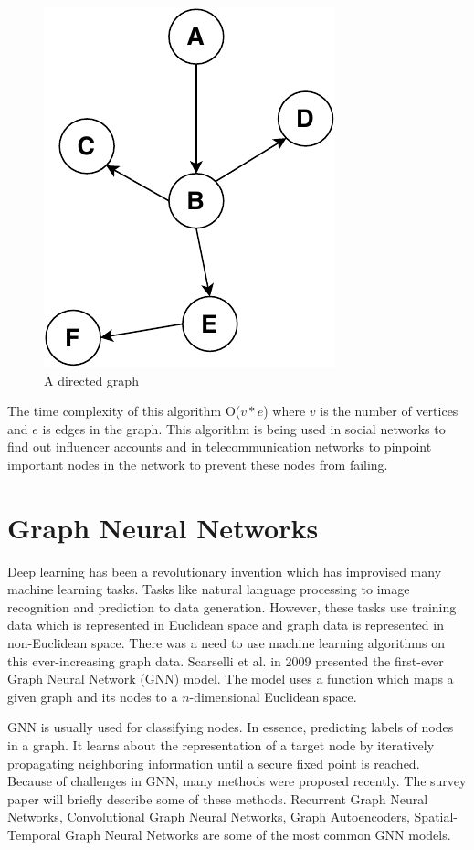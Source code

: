 \documentclass[journal,twoside,web]{ieeecolor}
\begin{document}
\begin{figure}[!h]
    \centerline{\includegraphics[scale=0.8]{figures/betweeness.pdf}}
    \caption{A directed graph}
    \label{fig15}
\end{figure}

The time complexity of this algorithm O($v*e$) where $v$ is the number of vertices and $e$ is edges in the graph. This algorithm is being used in social networks to find out influencer accounts and in telecommunication networks to pinpoint important nodes in the network to prevent these nodes from failing.

\section{Graph Neural Networks}
\label{sec:gnn}
Deep learning has been a revolutionary invention which has improvised many machine learning tasks. Tasks like natural language processing to image recognition and prediction to data generation. However, these tasks use training data which is represented in Euclidean space and graph data is represented in non-Euclidean space. There was a need to use machine learning algorithms on this ever-increasing graph data. Scarselli et al. in 2009 presented the first-ever Graph Neural Network (GNN) model\cite{34}. The model uses a function which maps a given graph and its nodes to a $n$-dimensional Euclidean space. 

GNN is usually used for classifying nodes. In essence, predicting labels of nodes in a graph. It learns about the representation of a target node by iteratively propagating neighboring information until a secure fixed point is reached. Because of challenges in GNN, many methods were proposed recently. The survey paper will briefly describe some of these methods. Recurrent Graph Neural Networks, Convolutional Graph Neural Networks, Graph Autoencoders, Spatial-Temporal Graph Neural Networks are some of the most common GNN models\cite{33}.
\end{document}

